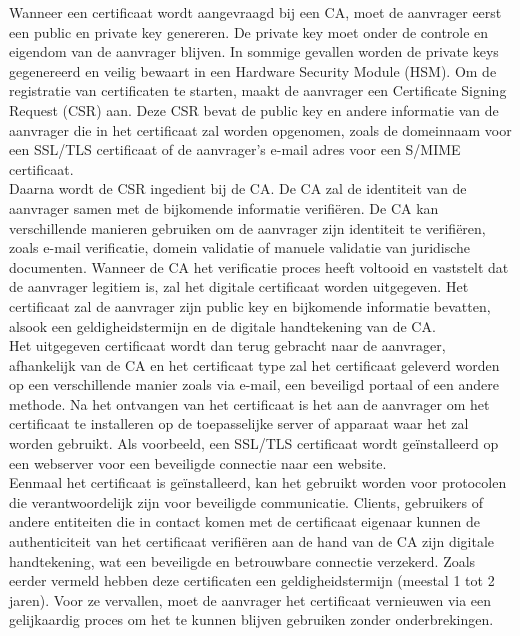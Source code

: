 Wanneer een certificaat wordt aangevraagd bij een CA, moet de aanvrager eerst een public en private key genereren. De private key moet onder de controle en eigendom van de aanvrager blijven. In sommige gevallen worden de private keys gegenereerd en veilig bewaart in een Hardware Security Module (HSM). \autocite{SSLcom}
Om de registratie van certificaten te starten, maakt de aanvrager een Certificate Signing Request (CSR) aan. Deze CSR bevat de public key en andere informatie van de aanvrager die in het certificaat zal worden opgenomen, zoals de domeinnaam voor een SSL/TLS certificaat of de aanvrager's e-mail adres voor een S/MIME certificaat. \\

Daarna wordt de CSR ingedient bij de CA. De CA zal de identiteit van de aanvrager samen met de bijkomende informatie verifiëren. De CA kan verschillende manieren gebruiken om de aanvrager zijn identiteit te verifiëren, zoals e-mail verificatie, domein validatie of manuele validatie van juridische documenten.
Wanneer de CA het verificatie proces heeft voltooid en vaststelt dat de aanvrager legitiem is, zal het digitale certificaat worden uitgegeven. Het certificaat zal de aanvrager zijn public key en bijkomende informatie bevatten, alsook een geldigheidstermijn en de digitale handtekening van de CA. \\

Het uitgegeven certificaat wordt dan terug gebracht naar de aanvrager, afhankelijk van de CA en het certificaat type zal het certificaat geleverd worden op een verschillende manier zoals via e-mail, een beveiligd portaal of een andere methode.
Na het ontvangen van het certificaat is het aan de aanvrager om het certificaat te installeren op de toepasselijke server of apparaat waar het zal worden gebruikt. Als voorbeeld, een SSL/TLS certificaat wordt geïnstalleerd op een webserver voor een beveiligde connectie naar een website. \\

Eenmaal het certificaat is geïnstalleerd, kan het gebruikt worden voor protocolen die verantwoordelijk zijn voor beveiligde communicatie. Clients, gebruikers of andere entiteiten die in contact komen met de certificaat eigenaar kunnen de authenticiteit van het certificaat verifiëren aan de hand van de CA zijn digitale handtekening, wat een beveiligde en betrouwbare connectie verzekerd.
Zoals eerder vermeld hebben deze certificaten een geldigheidstermijn (meestal 1 tot 2 jaren). Voor ze vervallen, moet de aanvrager het certificaat vernieuwen via een gelijkaardig proces om het te kunnen blijven gebruiken zonder onderbrekingen. \autocite{EncCon} \\

